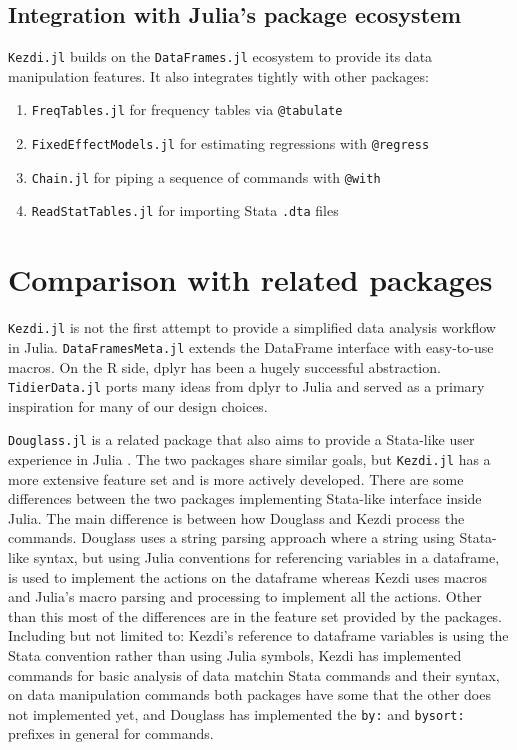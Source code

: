 \documentclass{juliacon}
\begin{document}
\subsection{Integration with Julia's package ecosystem}

\texttt{Kezdi.jl} builds on the \texttt{DataFrames.jl} ecosystem \cite{DataFrame.jl2023} to provide its data manipulation features. It also integrates tightly with other packages:

\begin{enumerate}
	\item \texttt{FreqTables.jl} \cite{FreqTables.jl2023} for frequency tables via \texttt{@tabulate}
	\item \texttt{FixedEffectModels.jl} \cite{FixedEffectModels.jl2023} for estimating regressions with \texttt{@regress}
	\item \texttt{Chain.jl} \cite{Chain} for piping a sequence of commands with \texttt{@with}
	\item \texttt{ReadStatTables.jl} \cite{ReadStatTables} for importing Stata \texttt{.dta} files
\end{enumerate}

\section{Comparison with related packages}
\texttt{Kezdi.jl} is not the first attempt to provide a simplified data analysis workflow in Julia. \texttt{DataFramesMeta.jl} \cite{DataFramesMeta} extends the DataFrame interface with easy-to-use macros. On the R side, dplyr \cite{dplyr2023} has been a hugely successful abstraction. \texttt{TidierData.jl} \cite{tidier2022} ports many ideas from dplyr to Julia and served as a primary inspiration for many of our design choices. 

\texttt{Douglass.jl} is a related package that also aims to provide a Stata-like user experience in Julia \cite{Douglass.jl2023}. The two packages share similar goals, but \texttt{Kezdi.jl} has a more extensive feature set and is more actively developed. There are some differences between the two packages implementing Stata-like interface inside Julia. The main difference is between how Douglass and Kezdi process the commands. Douglass uses a string parsing approach where a string using Stata-like syntax, but using Julia conventions for referencing variables in a dataframe, is used to implement the actions on the dataframe whereas Kezdi uses macros and Julia's macro parsing and processing to implement all the actions. Other than this most of the differences are in the feature set provided by the packages. Including but not limited to: Kezdi's reference to dataframe variables is using the Stata convention rather than using Julia symbols, Kezdi has implemented commands for basic analysis of data matchin Stata commands and their syntax, on data manipulation commands both packages have some that the other does not implemented yet, and Douglass has implemented the \texttt{by:} and \texttt{bysort:} prefixes in general for commands.
\end{document}
